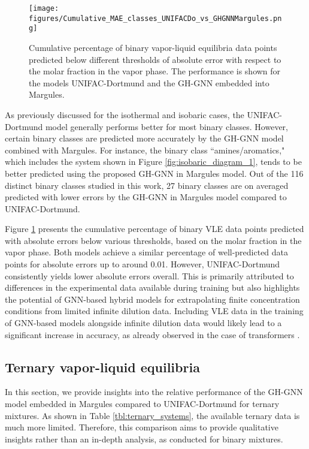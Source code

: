 \begin{figure}[h]
    \centering
    \texttt{[image: figures/Cumulative\_MAE\_classes\_UNIFACDo\_vs\_GHGNNMargules.png]}
    \caption{Cumulative percentage of binary vapor-liquid equilibria data points predicted below different thresholds of absolute error with respect to the molar fraction in the vapor phase. The performance is shown for the models UNIFAC-Dortmund and the GH-GNN embedded into Margules.}
    \label{fig:cummulative}
\end{figure}

As previously discussed for the isothermal and isobaric cases, the UNIFAC-Dortmund model generally performs better for most binary classes. However, certain binary classes are predicted more accurately by the GH-GNN model combined with Margules. For instance, the binary class ``amines/aromatics," which includes the system shown in Figure \ref{fig:isobaric_diagram_1}, tends to be better predicted using the proposed GH-GNN in Margules model. Out of the 116 distinct binary classes studied in this work, 27 binary classes are on averaged predicted with lower errors by the GH-GNN in Margules model compared to UNIFAC-Dortmund.

Figure \ref{fig:cummulative} presents the cumulative percentage of binary VLE data points predicted with absolute errors below various thresholds, based on the molar fraction in the vapor phase. Both models achieve a similar percentage of well-predicted data points for absolute errors up to around 0.01. However, UNIFAC-Dortmund consistently yields lower absolute errors overall. This is primarily attributed to differences in the experimental data available during training but also highlights the potential of GNN-based hybrid models for extrapolating finite concentration conditions from limited infinite dilution data. Including VLE data in the training of GNN-based models alongside infinite dilution data would likely lead to a significant increase in accuracy, as already observed in the case of transformers \cite{winter2023spt}.

\subsection{Ternary vapor-liquid equilibria}

In this section, we provide insights into the relative performance of the GH-GNN model embedded in Margules compared to UNIFAC-Dortmund for ternary mixtures. As shown in Table \ref{tbl:ternary_systems}, the available ternary data is much more limited. Therefore, this comparison aims to provide qualitative insights rather than an in-depth analysis, as conducted for binary mixtures.

